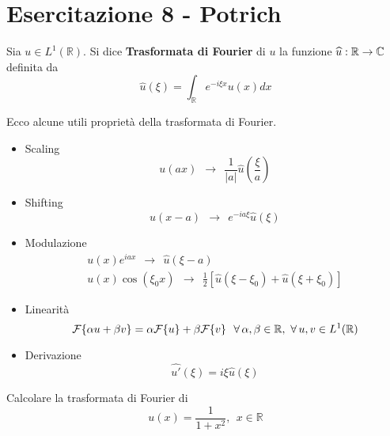 \chapter{Esercitazione 8 - Potrich}
\ParteEsercizi
\begin{defn}
Sia $u\in L^{1}(\mathbb{R})$. Si dice \textbf{Trasformata di Fourier} di $u$ la funzione $\widehat{u} :\mathbb{R}\rightarrow \mathbb{C} $ definita da
\begin{equation*}
\hat{u}( \xi ) =\int _{\mathbb{R}} e^{-i\xi x} u( x) dx
\end{equation*}
\end{defn}
\begin{thm}
[Proprietà] Ecco alcune utili proprietà della trasformata di Fourier.
\begin{itemize}
\item Scaling\begin{equation*}
u( ax) \ \ \rightarrow \ \ \frac{1}{| a| }\hat{u}\left(\frac{\xi }{a}\right)
\end{equation*}
\item Shifting\begin{equation*}
u( x-a) \ \ \rightarrow \ \ e^{-ia\xi }\hat{u}( \xi )
\end{equation*}
\item Modulazione\begin{gather*}
u( x) e^{iax} \ \ \rightarrow \ \ \hat{u}( \xi -a)\\
u( x)\cos( \xi _{0} x) \ \ \rightarrow \ \ \frac{1}{2}[\hat{u}( \xi -\xi _{0}) +\hat{u}( \xi +\xi _{0})]
\end{gather*}
\item Linearità\begin{equation*}
\Fc \{\alpha u+\beta v\} =\alpha \Fc \{u\} +\beta \Fc \{v\} \ \ \forall \alpha ,\beta \in \mathbb{R} ,\ \forall u,v\in L^{1}(\mathbb{R})
\end{equation*}
\item Derivazione\begin{equation*}
\widehat{u'}( \xi ) =i\xi \hat{u}( \xi )
\end{equation*}
\end{itemize}
\end{thm}

Calcolare la trasformata di Fourier di
\begin{equation*}
u( x) =\frac{1}{1+x^{2}} ,\ \ x\in \mathbb{R}
\end{equation*}

